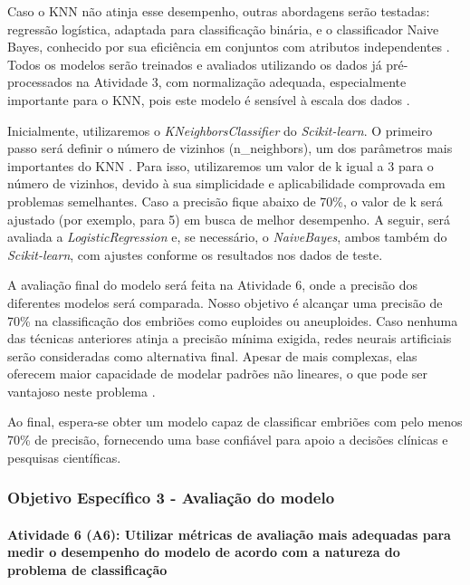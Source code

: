 Caso o KNN não atinja esse desempenho, outras abordagens serão testadas: regressão logística, adaptada para classificação binária, e o classificador Naive Bayes, conhecido por sua eficiência em conjuntos com atributos independentes \cite{zhang2016, rodrigues, rish2001}. Todos os modelos serão treinados e avaliados utilizando os dados já pré-processados na Atividade 3, com normalização adequada, especialmente importante para o KNN, pois este modelo é sensível à escala dos dados \cite{zhang2016}.

Inicialmente, utilizaremos o \textit{KNeighborsClassifier} do \textit{Scikit-learn}. O primeiro passo será definir o número de vizinhos (n\_neighbors), um dos parâmetros mais importantes do KNN \cite{zhang2016}. Para isso,  utilizaremos um valor de k igual a 3 para o número de vizinhos, devido à sua simplicidade e aplicabilidade comprovada em problemas semelhantes. Caso a precisão fique abaixo de 70\%, o valor de k será ajustado (por exemplo, para 5) em busca de melhor desempenho. A seguir, será avaliada a \textit{LogisticRegression} e, se necessário, o \textit{NaiveBayes}, ambos também do \textit{Scikit-learn}, com ajustes conforme os resultados nos dados de teste.

A avaliação final do modelo será feita na Atividade 6, onde a precisão dos diferentes modelos será comparada. Nosso objetivo é alcançar uma precisão de 70\% na classificação dos embriões como euploides ou aneuploides. Caso nenhuma das técnicas anteriores atinja a precisão mínima exigida, redes neurais artificiais serão consideradas como alternativa final. Apesar de mais complexas, elas oferecem maior capacidade de modelar padrões não lineares, o que pode ser vantajoso neste problema \cite{russell2016}.

Ao final, espera-se obter um modelo capaz de classificar embriões com pelo menos 70\% de precisão, fornecendo uma base confiável para apoio a decisões clínicas e pesquisas científicas.

\subsubsection{\textbf{Objetivo Específico 3} - Avaliação do modelo}

\paragraph{\textbf{Atividade 6 (A6):} Utilizar métricas de avaliação mais adequadas para medir o desempenho do modelo de acordo com a natureza do problema de classificação}


